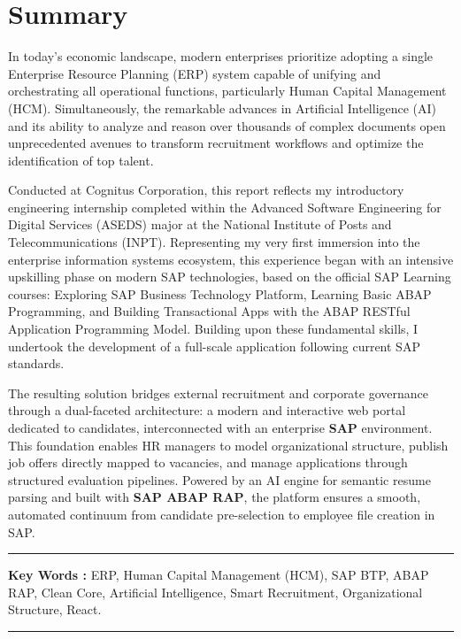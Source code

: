 \chapter*{Summary}

In today's economic landscape, modern enterprises prioritize adopting a single Enterprise Resource Planning (ERP) system capable of unifying and orchestrating all operational functions, particularly Human Capital Management (HCM). Simultaneously, the remarkable advances in Artificial Intelligence (AI) and its ability to analyze and reason over thousands of complex documents open unprecedented avenues to transform recruitment workflows and optimize the identification of top talent.

Conducted at Cognitus Corporation, this report reflects my introductory engineering internship completed within the Advanced Software Engineering for Digital Services (ASEDS) major at the National Institute of Posts and Telecommunications (INPT). Representing my very first immersion into the enterprise information systems ecosystem, this experience began with an intensive upskilling phase on modern SAP technologies, based on the official SAP Learning courses: Exploring SAP Business Technology Platform, Learning Basic ABAP Programming, and Building Transactional Apps with the ABAP RESTful Application Programming Model. Building upon these fundamental skills, I undertook the development of a full-scale application following current SAP standards.

The resulting solution bridges external recruitment and corporate governance through a dual-faceted architecture: a modern and interactive web portal dedicated to candidates, interconnected with an enterprise \textbf{SAP} environment. This foundation enables HR managers to model organizational structure, publish job offers directly mapped to vacancies, and manage applications through structured evaluation pipelines. Powered by an AI engine for semantic resume parsing and built with \textbf{SAP ABAP RAP}, the platform ensures a smooth, automated continuum from candidate pre-selection to employee file creation in SAP.

\noindent\rule[2pt]{\textwidth}{0.5pt}

{\textbf{Key Words :}}
ERP, Human Capital Management (HCM), SAP BTP, ABAP RAP, Clean Core, Artificial Intelligence, Smart Recruitment, Organizational Structure, React.
\\
\noindent\rule[2pt]{\textwidth}{0.5pt}